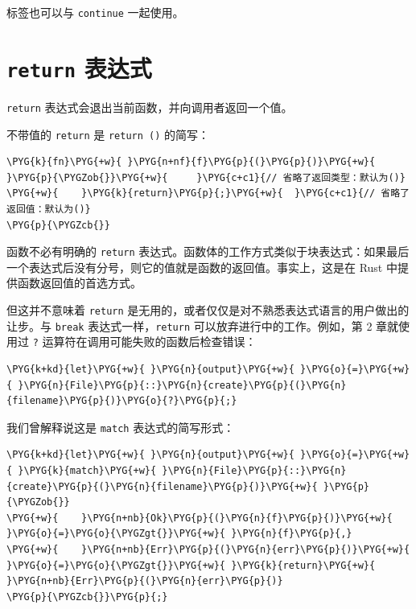 标签也可以与 \texttt{continue} 一起使用。

\section{\texttt{return} 表达式}

\texttt{return} 表达式会退出当前函数，并向调用者返回一个值。

不带值的 \texttt{return} 是 \texttt{return ()} 的简写：

\begin{Verbatim}[commandchars=\\\{\},breaklines=true,breakanywhere=true,fontsize=\codefont,xleftmargin=17bp]
\PYG{k}{fn}\PYG{+w}{ }\PYG{n+nf}{f}\PYG{p}{(}\PYG{p}{)}\PYG{+w}{ }\PYG{p}{\PYGZob{}}\PYG{+w}{     }\PYG{c+c1}{// 省略了返回类型：默认为()}
\PYG{+w}{    }\PYG{k}{return}\PYG{p}{;}\PYG{+w}{  }\PYG{c+c1}{// 省略了返回值：默认为()}
\PYG{p}{\PYGZcb{}}
\end{Verbatim}

函数不必有明确的 \texttt{return} 表达式。函数体的工作方式类似于块表达式：如果最后一个表达式后没有分号，则它的值就是函数的返回值。事实上，这是在 Rust 中提供函数返回值的首选方式。

但这并不意味着 \texttt{return} 是无用的，或者仅仅是对不熟悉表达式语言的用户做出的让步。与 \texttt{break} 表达式一样，\texttt{return} 可以放弃进行中的工作。例如，第 2 章就使用过 \texttt{?} 运算符在调用可能失败的函数后检查错误：

\begin{Verbatim}[commandchars=\\\{\},breaklines=true,breakanywhere=true,fontsize=\codefont,xleftmargin=17bp]
\PYG{k+kd}{let}\PYG{+w}{ }\PYG{n}{output}\PYG{+w}{ }\PYG{o}{=}\PYG{+w}{ }\PYG{n}{File}\PYG{p}{::}\PYG{n}{create}\PYG{p}{(}\PYG{n}{filename}\PYG{p}{)}\PYG{o}{?}\PYG{p}{;}
\end{Verbatim}

我们曾解释说这是 \texttt{match} 表达式的简写形式：

\begin{Verbatim}[commandchars=\\\{\},breaklines=true,breakanywhere=true,fontsize=\codefont,xleftmargin=17bp]
\PYG{k+kd}{let}\PYG{+w}{ }\PYG{n}{output}\PYG{+w}{ }\PYG{o}{=}\PYG{+w}{ }\PYG{k}{match}\PYG{+w}{ }\PYG{n}{File}\PYG{p}{::}\PYG{n}{create}\PYG{p}{(}\PYG{n}{filename}\PYG{p}{)}\PYG{+w}{ }\PYG{p}{\PYGZob{}}
\PYG{+w}{    }\PYG{n+nb}{Ok}\PYG{p}{(}\PYG{n}{f}\PYG{p}{)}\PYG{+w}{ }\PYG{o}{=}\PYG{o}{\PYGZgt{}}\PYG{+w}{ }\PYG{n}{f}\PYG{p}{,}
\PYG{+w}{    }\PYG{n+nb}{Err}\PYG{p}{(}\PYG{n}{err}\PYG{p}{)}\PYG{+w}{ }\PYG{o}{=}\PYG{o}{\PYGZgt{}}\PYG{+w}{ }\PYG{k}{return}\PYG{+w}{ }\PYG{n+nb}{Err}\PYG{p}{(}\PYG{n}{err}\PYG{p}{)}
\PYG{p}{\PYGZcb{}}\PYG{p}{;}
\end{Verbatim}

